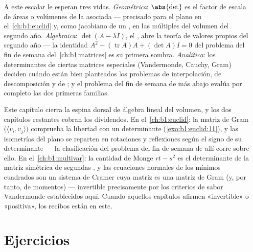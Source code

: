 \begin{remark}
\label{rem:b1:det:whereused}
A este escalar le esperan tres vidas. \emph{Geométrica}: $\abs{\det}$
es el factor de escala de áreas o volúmenes de la 
asociada --- precisado para el plano en el~\cref{ch:b1:euclid} y,
como jacobiano de un , en las  múltiples
del volumen del segundo año. \emph{Algebraica}:
$\det(A - \lambda I)$, el , abre la teoría
de valores propios del segundo año --- la identidad
$A^2 - (\operatorname{tr} A)A + (\det A)I = 0$ del problema del fin
de semana del~\cref{ch:b1:matrices} es su primera sombra.
\emph{Analítica}: los determinantes de ciertas matrices especiales
(Vandermonde, Cauchy, Gram) deciden cuándo están bien planteados los
problemas de interpolación, de descomposición y de ; y el
problema del fin de semana de más abajo evalúa por completo las dos
primeras familias.
\end{remark}

\begin{remark}
\label{rem:b1:det:perspectives}
Este capítulo cierra la espina dorsal de álgebra lineal del volumen,
y los dos capítulos restantes cobran los dividendos. En
el~\cref{ch:b1:euclid}: la matriz de Gram
$\bigl(\langle v_i, v_j\rangle\bigr)$ comprueba la libertad con un
determinante (\cref{exo:b1:euclid:11}), y las isometrías del plano se
reparten en rotaciones y reflexiones según el signo de su
determinante --- la clasificación del problema del fin de semana de
allí corre sobre ello. En el~\cref{ch:b1:multivar}: la cantidad de
Monge $rt - s^2$ es el determinante de la matriz simétrica de
segundas , y las ecuaciones normales de los mínimos
cuadrados son un sistema de Cramer cuya matriz es una matriz de Gram
(y, por tanto, de momentos) --- invertible precisamente por los
criterios de sabor Vandermonde establecidos aquí. Cuando aquellos
capítulos afirmen «invertible» o «positiva», los recibos están en
este.
\end{remark}

\section{Ejercicios}

